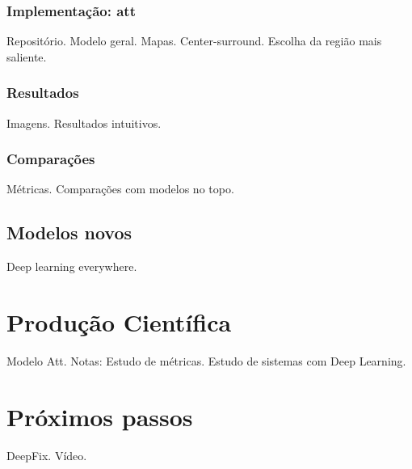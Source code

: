 \documentclass[11pt]{article}
\begin{document}
\subsubsection{Implementação: att}
Repositório.
Modelo geral.
Mapas.
Center-surround.
Escolha da região mais saliente.

\subsubsection{Resultados}
Imagens. Resultados intuitivos.

\subsubsection{Comparações}
Métricas.
Comparações com modelos no topo.

\subsection{Modelos novos}
Deep learning everywhere.

\section{Produção Científica}
Modelo Att.
Notas: Estudo de métricas.
Estudo de sistemas com Deep Learning.

\section{Próximos passos}
DeepFix. Vídeo.

\printbibliography
\end{document}
